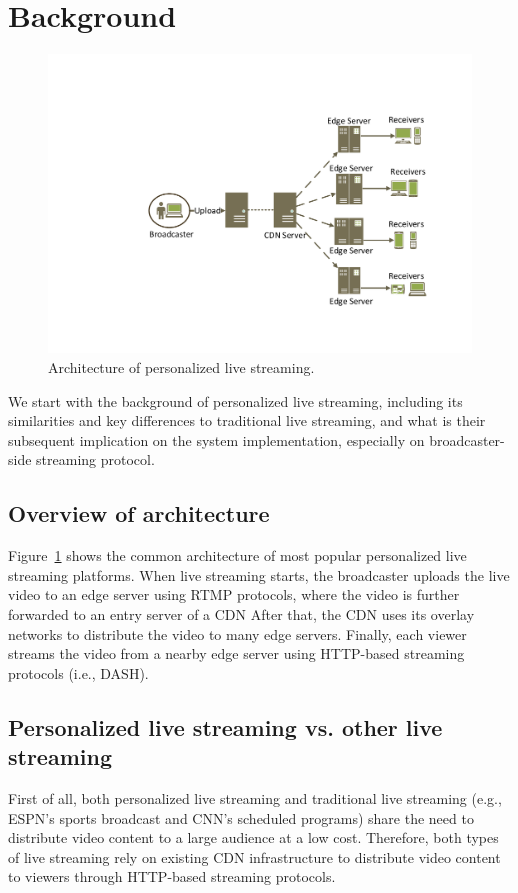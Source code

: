 \section{Background}

\begin{figure}[t]
\centerline{\includegraphics[width=0.9\columnwidth]{fig/architecture.pdf}}
\vspace{-0.08in}
\caption{Architecture of personalized live streaming.}
\vspace{-0.1in}
\label{fig:architecture}
\end{figure}

We start with the background of personalized live streaming, including
its similarities and key differences to traditional live streaming,
and what is their subsequent implication on the system implementation,
especially on broadcaster-side streaming protocol.

\subsection{Overview of architecture}
Figure~\ref{fig:architecture} shows the common architecture of
most popular personalized live streaming platforms.
When live streaming starts, the broadcaster uploads the live
video to an edge server using RTMP protocols, where the
video is further forwarded to an entry server of a CDN
After that, the CDN uses its overlay networks to distribute the
video to many edge servers.
Finally, each viewer streams the video from a nearby edge
server using HTTP-based streaming
protocols (i.e., DASH).

\subsection{Personalized live streaming vs. other live streaming}
First of all, both personalized live streaming and
traditional live streaming (e.g., ESPN's sports broadcast
and CNN's scheduled programs) share the need to
distribute video content to a large audience at a low cost.
Therefore, both types of live streaming rely on existing
CDN infrastructure to distribute video content to viewers through HTTP-based streaming protocols.

